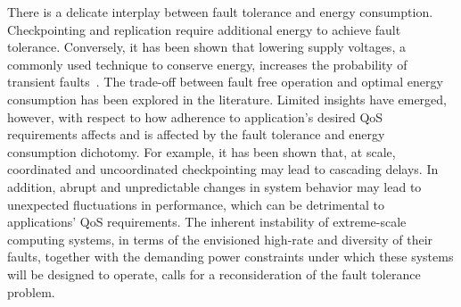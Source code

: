 There is a delicate interplay between fault tolerance and energy consumption. Checkpointing and replication require additional energy to achieve fault tolerance. Conversely, it has been shown that lowering supply voltages, a commonly used technique to conserve energy, increases the probability of transient faults~\cite{chandra2008defect}. The trade-off between fault free operation and optimal energy consumption has been explored in the literature. Limited insights have emerged, however, with respect to how adherence to application's desired QoS requirements affects and is affected by the fault tolerance and energy consumption dichotomy. For example, it has been shown that, at scale, coordinated and uncoordinated checkpointing may lead to cascading delays. %
In addition, abrupt and unpredictable changes in system behavior may lead to unexpected fluctuations in performance, which can be detrimental to applications' QoS requirements. The inherent instability of extreme-scale computing systems, in terms of the envisioned high-rate and diversity of their faults, together with the demanding power constraints under which these systems will be designed to operate, calls for a reconsideration of the fault tolerance problem.

